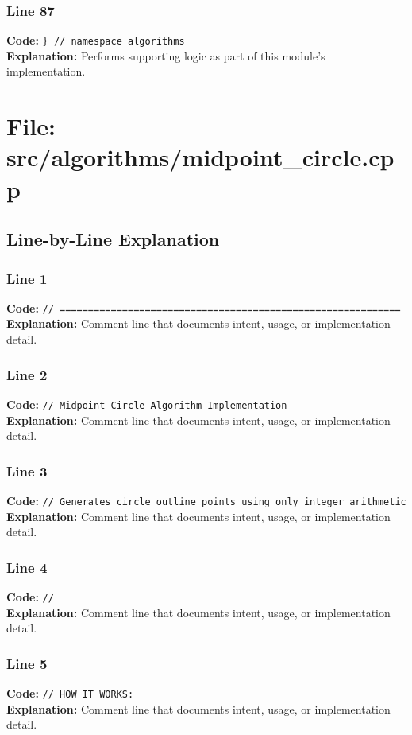 \documentclass[11pt,a4paper]{article}
\begin{document}
\subsubsection*{Line 87}
\textbf{Code:} \verb|} // namespace algorithms|\\
\textbf{Explanation:} Performs supporting logic as part of this module's implementation.

\newpage
\section{File: src/algorithms/midpoint\_circle.cpp}
\subsection{Line-by-Line Explanation}
\subsubsection*{Line 1}
\textbf{Code:} \verb|// ============================================================|\\
\textbf{Explanation:} Comment line that documents intent, usage, or implementation detail.

\subsubsection*{Line 2}
\textbf{Code:} \verb|// Midpoint Circle Algorithm Implementation|\\
\textbf{Explanation:} Comment line that documents intent, usage, or implementation detail.

\subsubsection*{Line 3}
\textbf{Code:} \verb|// Generates circle outline points using only integer arithmetic|\\
\textbf{Explanation:} Comment line that documents intent, usage, or implementation detail.

\subsubsection*{Line 4}
\textbf{Code:} \verb|//|\\
\textbf{Explanation:} Comment line that documents intent, usage, or implementation detail.

\subsubsection*{Line 5}
\textbf{Code:} \verb|// HOW IT WORKS:|\\
\textbf{Explanation:} Comment line that documents intent, usage, or implementation detail.
\end{document}
